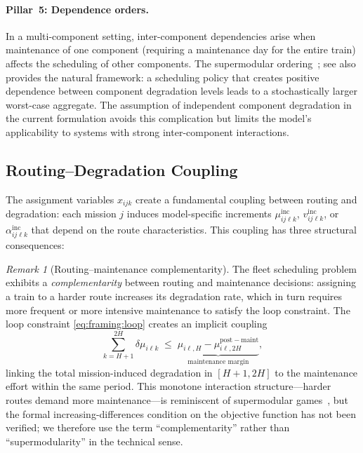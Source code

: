 \documentclass[11pt,a4paper]{article}
\theoremstyle{plain}
\theoremstyle{definition}
\theoremstyle{remark}
\newtheorem{remark}[theorem]{Remark}
\begin{document}
\paragraph{Pillar~5: Dependence orders.}
In a multi-component setting, inter-component dependencies arise when maintenance
of one component (requiring a maintenance day for the entire train) affects the
scheduling of other components. The supermodular
ordering~\cite[Ch.~3]{muller2002}; see also \cite{muller2006}
provides the natural framework: a scheduling policy that creates positive dependence
between component degradation levels leads to a stochastically larger worst-case
aggregate. The assumption of independent component degradation in the current
formulation avoids this complication but limits the model's applicability to
systems with strong inter-component interactions.

\subsection{Routing--Degradation Coupling}
\label{sec:framing:coupling}

The assignment variables $x_{ijk}$ create a fundamental coupling between routing
and degradation: each mission $j$ induces model-specific increments
$\mu^{\mathrm{inc}}_{ij\ell k}$, $v^{\mathrm{inc}}_{ij\ell k}$, or
$\alpha^{\mathrm{inc}}_{ij\ell k}$ that depend on the route characteristics.
This coupling has three structural consequences:

\begin{remark}[Routing--maintenance complementarity]\label{rem:complementarity}
The fleet scheduling problem exhibits a \emph{complementarity} between
routing and maintenance decisions: assigning a train to a harder route increases
its degradation rate, which in turn requires more frequent or more intensive
maintenance to satisfy the loop constraint. The loop constraint
\eqref{eq:framing:loop} creates an implicit coupling
\begin{equation}\label{eq:framing:coupling}
  \sum_{k=H+1}^{2H} \delta\mu_{i\ell k}
  \;\le\;
  \underbrace{\mu_{i\ell,H} - \mu_{i\ell,2H}^{\mathrm{post-maint}}}_{\text{maintenance margin}},
\end{equation}
linking the total mission-induced degradation in $[H{+}1, 2H]$ to the
maintenance effort within the same period.
This monotone interaction structure---harder routes demand more
maintenance---is reminiscent of supermodular games~\cite{topkis1998},
but the formal increasing-differences condition on the objective function
has not been verified; we therefore use the term ``complementarity''
rather than ``supermodularity'' in the technical sense.
\end{remark}
\end{document}
